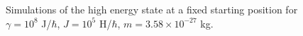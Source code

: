 \documentclass[main.tex]{subfiles}
\begin{document}
\begin{figure}[h]
    \qquad
    \caption{\centering Simulations of the high energy state at a fixed starting position for \(\gamma
    = 10^{8}\) J/\(\hbar{}\), \(J= 10^{5}\) H/\(\hbar{}\), \(m = 3.58\times 10^{-27}\) kg.}%
    \label{fig:n2m-27B}
\end{figure}
\end{document}
